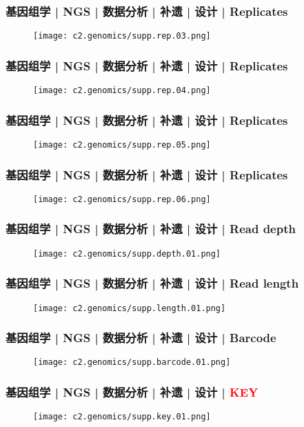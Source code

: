 \begin{frame}
  \frametitle{基因组学 | NGS | 数据分析 | 补遗 | 设计 | Replicates}
  \begin{figure}
    \centering
    \texttt{[image: c2.genomics/supp.rep.03.png]}
  \end{figure}
\end{frame}

\begin{frame}
  \frametitle{基因组学 | NGS | 数据分析 | 补遗 | 设计 | Replicates}
  \begin{figure}
    \centering
    \texttt{[image: c2.genomics/supp.rep.04.png]}
  \end{figure}
\end{frame}

\begin{frame}
  \frametitle{基因组学 | NGS | 数据分析 | 补遗 | 设计 | Replicates}
  \begin{figure}
    \centering
    \texttt{[image: c2.genomics/supp.rep.05.png]}
  \end{figure}
\end{frame}

\begin{frame}
  \frametitle{基因组学 | NGS | 数据分析 | 补遗 | 设计 | Replicates}
  \begin{figure}
    \centering
    \texttt{[image: c2.genomics/supp.rep.06.png]}
  \end{figure}
\end{frame}

\begin{frame}
  \frametitle{基因组学 | NGS | 数据分析 | 补遗 | 设计 | Read depth}
  \begin{figure}
    \centering
    \texttt{[image: c2.genomics/supp.depth.01.png]}
  \end{figure}
\end{frame}

\begin{frame}
  \frametitle{基因组学 | NGS | 数据分析 | 补遗 | 设计 | Read length}
  \begin{figure}
    \centering
    \texttt{[image: c2.genomics/supp.length.01.png]}
  \end{figure}
\end{frame}

\begin{frame}
  \frametitle{基因组学 | NGS | 数据分析 | 补遗 | 设计 | Barcode}
  \begin{figure}
    \centering
    \texttt{[image: c2.genomics/supp.barcode.01.png]}
  \end{figure}
\end{frame}

\begin{frame}
  \frametitle{基因组学 | NGS | 数据分析 | 补遗 | 设计 | \textcolor{red}{KEY}}
  \begin{figure}
    \centering
    \texttt{[image: c2.genomics/supp.key.01.png]}
  \end{figure}
\end{frame}

